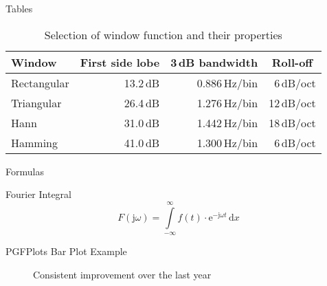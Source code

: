 \documentclass[newPxFont]{beamer}
\begin{document}
\begin{frame}{Tables}
\begin{table}[]
  \caption{Selection of window function and their properties}
  \begin{tabular}[]{lrrr}
    \toprule
    \textbf{Window}     & \multicolumn{1}{c}{\textbf{First side lobe}}
                        & \multicolumn{1}{c}{\textbf{3\,dB bandwidth}}
                        & \multicolumn{1}{c}{\textbf{Roll-off}} \\
    \midrule
    Rectangular       & 13.2\,dB  & 0.886\,Hz/bin & 6\,dB/oct   \\[0.25em]
    Triangular        & 26.4\,dB  & 1.276\,Hz/bin & 12\,dB/oct  \\[0.25em]
    Hann          & 31.0\,dB  & 1.442\,Hz/bin & 18\,dB/oct  \\[0.25em]
    Hamming         & 41.0\,dB  & 1.300\,Hz/bin & 6\,dB/oct   \\
    \bottomrule
  \end{tabular}
  \label{tab:WindowFunctions}
\end{table}
\end{frame}


\begin{frame}{Formulas}
\begin{block}{Fourier Integral}
\[
F(\textrm{j}\omega) = \displaystyle \int \limits_{-\infty}^{\infty} \! f(t)\cdot\textrm{e}^{-\textrm{j}\omega t}  \, \mathrm{d} x
\]
\end{block}
\end{frame}


\begin{frame}{PGFPlots Bar Plot Example}
  \begin{figure}[h]
    \centering
    \caption{Consistent improvement over the last year}
    \end{figure}
\end{frame}
\end{document}
